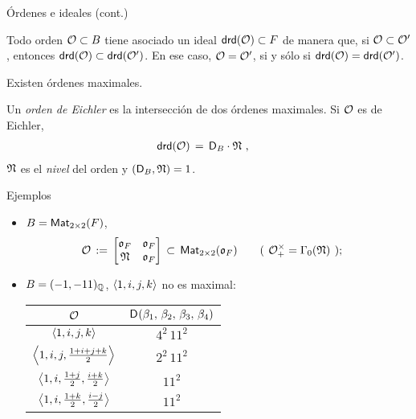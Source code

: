 \begin{frame}{\'{O}rdenes e ideales (cont.)}
	\begin{lemaDiscriminanteReducido}\label{lema:discriminantereducido}
		Todo orden $\cal O\subset B$ tiene asociado un ideal
		$\drd(\cal O)\subset F$ de manera que, si
		$\cal O\subset\cal O'$, entonces
		\begin{math}
			\drd(\cal O)\subset\drd(\cal O')
		\end{math}.
		En ese caso, $\cal O=\cal O'$, si y s\'{o}lo si
		$\drd(\cal O)=\drd(\cal O')$.
	\end{lemaDiscriminanteReducido}
	\begin{obsDiscriminanteReducido}\label{obs:discriminantereducido}
		Existen \'{o}rdenes maximales.
	\end{obsDiscriminanteReducido}
	\begin{defOrdenDeEichler}\label{def:ordendeeichler}
		Un \emph{orden de Eichler} es la intersecci\'{o}n de dos
		\'{o}rdenes maximales. Si $\cal O$ es de Eichler,
		\begin{align*}
			\drd(\cal O) & \,=\,\disc[B]\cdot\frak N
			\text{ ,}
		\end{align*}
		$\frak N$ es el \emph{nivel} del orden y
		$(\disc[B],\frak N)=1$.
	\end{defOrdenDeEichler}
\end{frame}

\begin{frame}{Ejemplos}
	\begin{itemize}
		\item $B=\MM[2\times 2](F)$,
			\begin{align*}
				\cal O\,:=\,
				\left[\begin{matrix}
					\oka F & \oka F \\ \frak N & \oka F
				\end{matrix}\right] \,\subset\,
				\MM[2\times 2](\oka F)
				& \qquad \text{(\phantom)}
					\cal O_+^\times=\Gamma_0(\frak N)
					\text{\phantom();}
			\end{align*}
		\item $B=\quatalg[\bb Q]{-1,-11}$, $\generado{1,i,j,k}$
			no es maximal:
			\begin{center}
				\begin{tabular}{c|c}
					$\cal O$ &
						\begin{math}
							\disc(\beta_1,\,
								\beta_2,\,
								\beta_3,\,
								\beta_4)
						\end{math} \\
					\hline
					$\generado{1,i,j,k}$ &
						$4^2\,11^2$ \\
					$\generado{1,i,j,\frac{1+i+j+k}{2}}$ &
						$2^2\,11^2$ \\
					$\generado{1,i,\frac{1+j}{2},%
						\frac{i+k}{2}}$ & $11^2$ \\
					$\generado{1,i,\frac{1+k}{2},%
						\frac{i-j}{2}}$ & $11^2$
				\end{tabular}
			\end{center}
	\end{itemize}
\end{frame}


